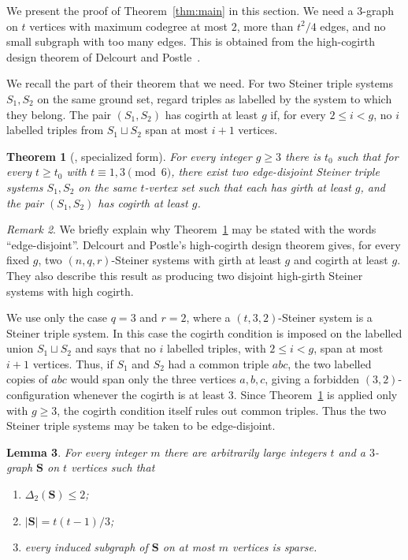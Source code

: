 \documentclass[10pt]{article}
\numberwithin{equation}{section}
\newtheorem{theorem}{Theorem}[section]
\newtheorem{lemma}[theorem]{Lemma}
\theoremstyle{definition}
\theoremstyle{remark}
\newtheorem{remark}[theorem]{Remark}
\newcommand{\Sint}{\mathbf{S}}
\begin{document}
We present the proof of Theorem~\ref{thm:main} in this section. We need a $3$-graph on $t$ vertices with maximum codegree at most $2$, more than $t^2/4$ edges, and no small subgraph with too many edges. This is obtained from the high-cogirth design theorem of Delcourt and Postle~\cite{DelcourtPostle24}.

We recall the part of their theorem that we need. For two Steiner triple systems $S_1,S_2$ on the same ground set, regard triples as labelled by the system to which they belong. The pair $(S_1,S_2)$ has cogirth at least $g$ if, for every $2\le i<g$, no $i$ labelled triples from $S_1\sqcup S_2$ span at most $i+1$ vertices.

\begin{theorem}[\cite{DelcourtPostle24}, specialized form]\label{thm:DP}
    For every integer $g \ge 3$ there is $t_0$ such that for every $t\ge t_0$ with $t\equiv1,3\pmod6$, there exist two edge-disjoint Steiner triple systems $S_1,S_2$ on the same $t$-vertex set such that each has girth at least $g$, and the pair $(S_1,S_2)$ has cogirth at least $g$.
\end{theorem}

\begin{remark}
We briefly explain why Theorem~\ref{thm:DP} may be stated with the words
``edge-disjoint''. Delcourt and Postle's high-cogirth design theorem
gives, for every fixed $g$, two $(n,q,r)$-Steiner systems with girth
at least $g$ and cogirth at least $g$. They also describe this result
as producing two disjoint high-girth Steiner systems with high cogirth.

We use only the case $q=3$ and $r=2$, where a
$(t,3,2)$-Steiner system is a Steiner triple system. In this case the
cogirth condition is imposed on the labelled union $S_1\sqcup S_2$ and
says that no $i$ labelled triples, with $2\le i<g$, span at most
$i+1$ vertices. Thus, if $S_1$ and $S_2$ had a common triple
$abc$, the two labelled copies of $abc$ would span only the three
vertices $a,b,c$, giving a forbidden $(3,2)$-configuration whenever
the cogirth is at least $3$. Since Theorem~\ref{thm:DP} is applied only with $g\ge3$, the cogirth condition itself rules out common triples. Thus the two Steiner triple systems may be taken to be edge-disjoint.
\end{remark}

\begin{lemma}\label{lem:code}
For every integer $m$ there are arbitrarily large integers $t$ and a $3$-graph $\Sint$ on $t$ vertices such that
\begin{enumerate}[label=(\roman*)]
\item $\Delta_2(\Sint)\le2$;
\item $|\Sint|=t(t-1)/3$;
\item every induced subgraph of $\Sint$ on at most $m$ vertices is sparse.
\end{enumerate}
\end{lemma}
\end{document}
